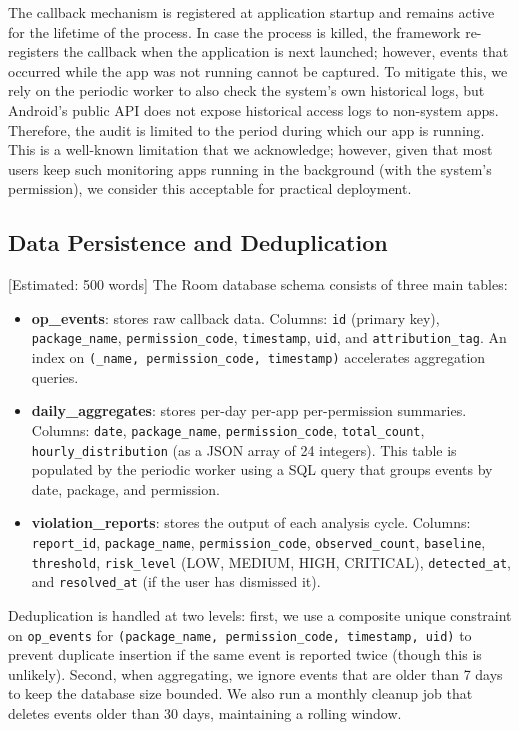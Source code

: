 The callback mechanism is registered at application startup and remains active for the lifetime of the process. In case the process is killed, the framework re-registers the callback when the application is next launched; however, events that occurred while the app was not running cannot be captured. To mitigate this, we rely on the periodic worker to also check the system's own historical logs, but Android's public API does not expose historical access logs to non-system apps. Therefore, the audit is limited to the period during which our app is running. This is a well-known limitation that we acknowledge; however, given that most users keep such monitoring apps running in the background (with the system's permission), we consider this acceptable for practical deployment.

\subsection{Data Persistence and Deduplication} [Estimated: 500 words]
The Room database schema consists of three main tables:

\begin{itemize}
\item \textbf{op\_events}: stores raw callback data. Columns: \texttt{id} (primary key), \texttt{package\_name}, \texttt{permission\_code}, \texttt{timestamp}, \texttt{uid}, and \texttt{attribution\_tag}. An index on \texttt{(\package\_name, permission\_code, timestamp)} accelerates aggregation queries.
\item \textbf{daily\_aggregates}: stores per-day per-app per-permission summaries. Columns: \texttt{date}, \texttt{package\_name}, \texttt{permission\_code}, \texttt{total\_count}, \texttt{hourly\_distribution} (as a JSON array of 24 integers). This table is populated by the periodic worker using a SQL query that groups events by date, package, and permission.
\item \textbf{violation\_reports}: stores the output of each analysis cycle. Columns: \texttt{report\_id}, \texttt{package\_name}, \texttt{permission\_code}, \texttt{observed\_count}, \texttt{baseline}, \texttt{threshold}, \texttt{risk\_level} (LOW, MEDIUM, HIGH, CRITICAL), \texttt{detected\_at}, and \texttt{resolved\_at} (if the user has dismissed it).
\end{itemize}

Deduplication is handled at two levels: first, we use a composite unique constraint on \texttt{op\_events} for \texttt{(package\_name, permission\_code, timestamp, uid)} to prevent duplicate insertion if the same event is reported twice (though this is unlikely). Second, when aggregating, we ignore events that are older than 7 days to keep the database size bounded. We also run a monthly cleanup job that deletes events older than 30 days, maintaining a rolling window.

